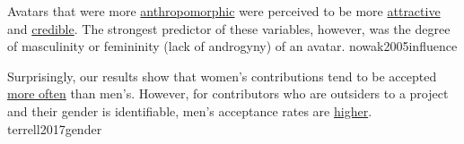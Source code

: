 \documentclass{article}
\begin{document}



  {Avatars that were more \ul{anthropomorphic} were perceived to be more \ul{attractive} and \ul{credible}. The strongest predictor of these variables, however, was the degree of masculinity or femininity (lack of androgyny) of an avatar.}
  {nowak2005influence}

  {Surprisingly, our results show that women's contributions tend to be accepted \ul{more often} than men's. However, for contributors who are outsiders to a project and their gender is identifiable, men's acceptance rates are \ul{higher}.}
  {terrell2017gender}
\end{document}
